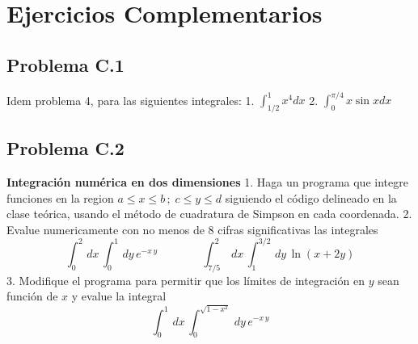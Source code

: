 \documentclass[11pt]{article}
\begin{document}
    \hypertarget{ejercicios-complementarios}{%
\section*{Ejercicios Complementarios}\label{ejercicios-complementarios}}

    \hypertarget{problema-c.1}{%
\subsection*{Problema C.1}\label{problema-c.1}}

Idem problema 4, para las siguientes integrales: 1.
\(\int_{1/2}^1 x^4 dx\) 2. \(\int_0^{\pi/4} x \sin x dx\)

    \hypertarget{problema-c.2}{%
\subsection*{Problema C.2}\label{problema-c.2}}

\textbf{Integración numérica en dos dimensiones} 1. Haga un programa que
integre funciones en la region \(a\le x \le b\,;\;c \le y \le d\)
siguiendo el código delineado en la clase teórica, usando el método de
cuadratura de Simpson en cada coordenada. 2. Evalue numericamente con no
menos de 8 cifras significativas las integrales \[
\int_0^2\,dx\, \int_0^1\,dy\, e^{-x\,y} \;\;\;\;\;\;\;\;\;\;\;\;\;\;
\int_{7/5}^2\,dx\, \int_1^{3/2}\,dy\, \ln{(x+2 y)}
\] 3. Modifique el programa para permitir que los límites de integración
en \(y\) sean función de \(x\) y evalue la integral \[
\int_0^1\,dx\, \int_0^{\sqrt{1-x^2}}\,dy\, e^{-x\,y} 
\]


    
    
    
    
\end{document}

